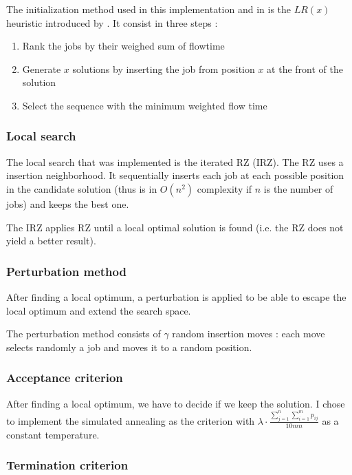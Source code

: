 \documentclass[a4paper]{article}
\begin{document}
The initialization method used in this implementation and in \cite{panruiz2012} is the $LR(x)$ heuristic introduced by \cite{liu2001}.  It consist in three steps :
\begin{enumerate}
    \item Rank the jobs by their weighed sum of flowtime
    \item Generate $x$ solutions by inserting the job from position $x$ at the front of the solution
    \item Select the sequence with the minimum weighted flow time
\end{enumerate}

\subsubsection{Local search}
\label{RZ}
The local search that was implemented is the iterated RZ (IRZ). The RZ uses a insertion neighborhood.
It sequentially inserts each job at each possible position in the candidate solution (thus is in $O(n^2)$ complexity if $n$ is the number of jobs) and keeps the best one.

The IRZ applies RZ until a local optimal solution is found (i.e. the RZ does not yield a better result).

\subsubsection{Perturbation method}
\label{pertu}

After finding a local optimum, a perturbation is applied to be able to escape the local optimum and extend the search space.

The perturbation method consists of $\gamma$ random insertion moves : each move selects randomly a job and moves it to a random position.

\subsubsection{Acceptance criterion}

After finding a local optimum, we have to decide if we keep the solution. I chose to implement the {simulated annealing} as the criterion with $\lambda \cdot \frac{\sum_{j=1}^{n} \sum_{i=1}^{m} p_{ij}}{10 mn}$ as a constant temperature.

\subsubsection{Termination criterion}
\end{document}
